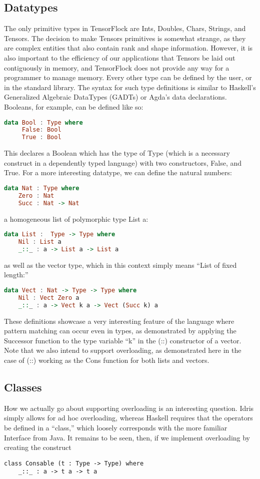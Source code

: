 \documentclass[12pt]{article}
\begin{document}
\subsection{Datatypes}
The only primitive types in TensorFlock are Ints, Doubles, Chars, Strings, and Tensors. The decision to make Tensors primitives is somewhat strange, as they are complex entities that also contain rank and shape information. However, it is also important to the efficiency of our applications that Tensors be laid out contiguously in memory, and TensorFlock does not provide any way for a programmer to manage memory. 
Every other type can be defined by the user, or in the standard library. The syntax for such type definitions is similar to Haskell's Generalized Algebraic DataTypes (GADTs) or Agda's data declarations. Booleans, for example, can be defined like so:
\begin{lstlisting}[language=Haskell]
data Bool : Type where
     False: Bool
     True : Bool
\end{lstlisting}
This declares a Boolean which has the type of Type (which is a necessary construct in a dependently typed language) with two constructors, False, and True. For a more interesting datatype, we can define the natural numbers:
\begin{lstlisting}[language=Haskell]
data Nat : Type where
    Zero : Nat
    Succ : Nat -> Nat
\end{lstlisting}
 a homogeneous list of polymorphic type List a:
\begin{lstlisting}[language=Haskell]
data List :  Type -> Type where
    Nil : List a    
    _::_ : a -> List a -> List a
\end{lstlisting}
as well as the vector type, which in this context simply means ``List of fixed length:''
\begin{lstlisting}[language=Haskell]
data Vect : Nat -> Type -> Type where
    Nil : Vect Zero a
    _::_ : a -> Vect k a -> Vect (Succ k) a
\end{lstlisting}
These definitions showcase a very interesting feature of the language where pattern matching can occur even in types, as demonstrated by applying the Successor function to the type variable ``k'' in the (::) constructor of a vector. Note that we also intend to support overloading, as demonstrated here in the case of (::) working as the Cons function for both lists and vectors. 
\subsection{Classes}
How we actually go about supporting overloading is an interesting question. Idris simply allows for ad hoc overloading, whereas Haskell requires that the operators be defined in a ``class,'' which loosely corresponds with the more familiar Interface from Java. It remains to be seen, then, if we implement overloading by creating the construct 
\begin{lstlisting}
class Consable (t : Type -> Type) where
	_::_ : a -> t a -> t a
\end{lstlisting}
\end{document}
